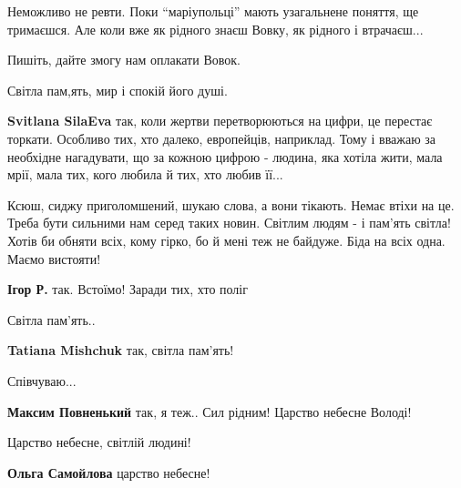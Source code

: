 
Неможливо не ревти. Поки \enquote{маріупольці} мають узагальнене поняття, ще
тримаєшся. Але коли вже як рідного знаєш Вовку, як рідного і втрачаєш...

Пишіть, дайте змогу нам оплакати Вовок.

Світла пам,ять, мир і спокій його душі.

\begin{itemize} %
\textbf{Svitlana SilaEva} так, коли жертви перетворюються на цифри, це перестає торкати. Особливо тих, хто далеко, европейців, наприклад. Тому і вважаю за необхідне нагадувати, що за кожною цифрою - людина, яка хотіла жити, мала мрії, мала тих, кого любила й тих, хто любив її...
\end{itemize} %


Ксюш, сиджу приголомшений, шукаю слова, а вони тікають. Немає втіхи на це.
Треба бути сильними нам серед таких новин. Світлим людям - і пам'ять світла!
Хотів би обняти всіх, кому гірко, бо й мені теж не байдуже. Біда на всіх одна.
Маємо вистояти!

\begin{itemize} %
\textbf{Ігор Р.} так. Встоїмо! Заради тих, хто поліг
\end{itemize} %


Світла пам'ять..

\begin{itemize} %
\textbf{Tatiana Mishchuk} так, світла пам'ять!
\end{itemize} %


Співчуваю...

\begin{itemize} %
\textbf{Максим Повненький} так, я теж.. Сил рідним! Царство небесне Володі!
\end{itemize} %


Царство небесне, світлій людині!🙏🙏🙏

\begin{itemize} %
\textbf{Ольга Самойлова} царство небесне!
\end{itemize} %


